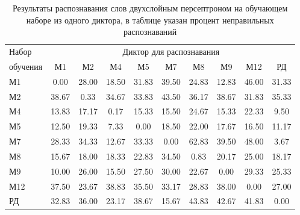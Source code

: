 \begin{table}[h]
	\centering
	\caption{Результаты распознавания слов двухслойным персептроном на обучающем наборе из одного диктора, в таблице указан процент неправильных распознаваний}
	\label{tab:mlp2_dictor1}
	\begin{tabular}{| l | c | c | c | c | c | c | c | c | c |}
		\hline
		Набор & \multicolumn{9}{c|}{Диктор для распознавания} \\
		\hhline{~---------}
		обучения \phantom{0000} & М1      & М2    	 & М4      & М5    	 & М7      & М8    	 & М9      & М12   	 & РД \\
		\hline
		М1		 &  0.00 & 28.00 & 18.50 & 31.83 & 39.50 & 24.83 & 12.83 & 46.00 & 31.33 \\
		М2		 & 38.67 &  0.33 & 34.67 & 33.83 & 43.50 & 36.17 & 38.67 & 31.83 & 35.33 \\
		М4		 & 13.83 & 17.17 &  0.17 & 15.33 & 15.50 & 24.67 & 15.33 & 22.33 &  9.50 \\
		М5		 & 12.50 & 19.33 &  7.33 &  0.00 & 18.50 & 22.00 & 17.67 & 16.50 & 11.17 \\
		М7		 & 28.33 & 34.33 & 12.67 & 33.33 &  0.00 & 62.83 & 39.50 & 48.00 &  3.67 \\
		М8		 & 15.67 & 18.00 & 18.33 & 22.83 & 34.50 &  0.83 & 20.17 & 25.00 & 18.17 \\
		М9		 & 10.00 & 26.00 & 15.50 & 27.50 & 30.00 & 22.67 &  0.00 & 29.33 & 25.33 \\
		М12		 & 37.50 & 23.67 & 38.83 & 35.50 & 33.17 & 28.83 & 38.00 &  0.00 & 27.00 \\
		РД		 & 32.83 & 36.00 & 23.17 & 38.67 & 15.67 & 43.83 & 42.67 & 41.83 &  0.00 \\
		\hline
	\end{tabular}
\end{table}

